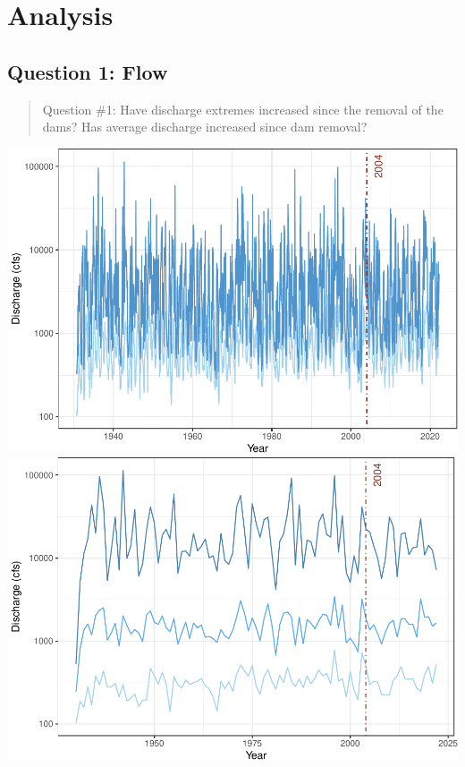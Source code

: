\documentclass[
  12pt,
]{article}
\begin{document}
\newpage

\hypertarget{analysis}{%
\section{Analysis}\label{analysis}}

\hypertarget{question-1-flow}{%
\subsection{Question 1: Flow}\label{question-1-flow}}

\begin{quote}
Question \#1: Have discharge extremes increased since the removal of the
dams? Has average discharge increased since dam removal?
\end{quote}

\includegraphics{Project_Template_files/figure-latex/Flow.analysis-1.pdf}
\includegraphics{Project_Template_files/figure-latex/Flow.analysis-2.pdf}
\end{document}
